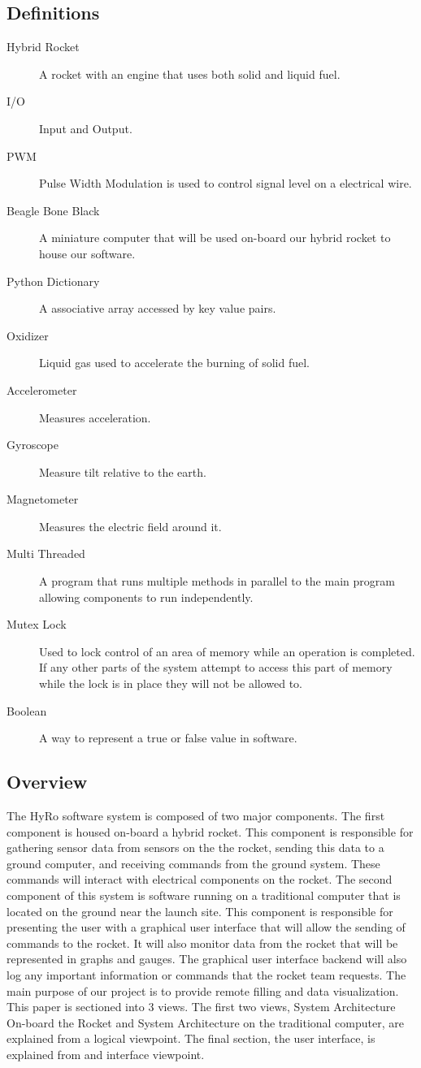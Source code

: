 \documentclass[10pt,draftclsnofoot,onecolumn,retainorgcmds]{IEEEtran}
\begin{document}
\subsection{Definitions}
\begin{description}
	\item[Hybrid Rocket] A rocket with an engine that uses both solid and liquid fuel.
	\item[I/O] Input and Output.
	\item[PWM] Pulse Width Modulation is used to control signal level on a electrical wire.
	\item[Beagle Bone Black] A miniature computer that will be used on-board our hybrid rocket to house our software.
	\item[Python Dictionary] A associative array accessed by key value pairs.
	\item[Oxidizer] Liquid gas used to accelerate the burning of solid fuel.
	\item[Accelerometer] Measures acceleration.
	\item[Gyroscope] Measure tilt relative to the earth.
	\item[Magnetometer] Measures the electric field around it.
	\item[Multi Threaded] A program that runs multiple methods in parallel to the main program allowing components to run independently.
	\item[Mutex Lock] Used to lock control of an area of memory while an operation is completed. If any other parts of the system attempt to access this part of memory while the lock is in place they will not be allowed to.
	\item[Boolean] A way to represent a true or false value in software.
\end{description}
\subsection{Overview}
The HyRo software system is composed of two major components. The first component is housed on-board a hybrid rocket. This component is responsible for gathering sensor data from sensors on the the rocket, sending this data to a ground computer, and receiving commands from the ground system. These commands will interact with electrical components on the rocket. The second component of this system is software running on a traditional computer that is located on the ground near the launch site. This component is responsible for presenting the user with a graphical user interface that will allow the sending of commands to the rocket. It will also monitor data from the rocket that will be represented in graphs and gauges. The graphical user interface backend will also log any important information or commands that the rocket team requests. The main purpose of our project is to provide remote filling and data visualization. This paper is sectioned into 3 views. The first two views, System Architecture On-board the Rocket and System Architecture on the traditional computer, are explained from a logical viewpoint. The final section, the user interface, is explained from and interface viewpoint.
\end{document}
